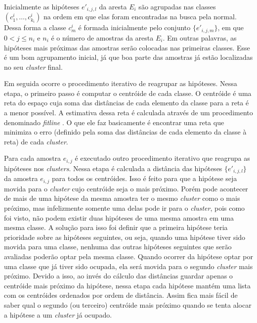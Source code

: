 

Inicialmente as hipóteses $e'_{i,j,l}$ da aresta $E_i$ são agrupadas nas classes $(c^i_1, \dots, c^i_{k_i})$ na ordem em que elas foram encontradas na busca pela normal. Dessa forma a classe $c^i_m$ é formada inicialmente pelo conjunto $\{e'_{i,j,m}\}$, em que $0 < j \leq n_i$ e $n_i$ é o número de amostras da aresta $E_i$. Em outras palavras, as hipóteses mais próximas das amostras serão colocadas nas primeiras classes. Esse é um bom agrupamento inicial, já que boa parte das amostras já estão localizadas no seu \emph{cluster} final.

Em seguida ocorre o procedimento iterativo de reagrupar as hipóteses. Nessa etapa, o primeiro passo é computar o centróide de cada classe. O centróide é uma reta do espaço cuja soma das distâncias de cada elemento da classe para a reta é a menor possível. A estimativa dessa reta é calculada através de um procedimento denominado \emph{fitline} \cite{fitline_doc}. O que ele faz basicamente é encontrar uma reta que minimiza o erro (definido pela soma das distâncias de cada elemento da classe à reta) de cada \emph{cluster}.

Para cada amostra $e_{i,j}$ é executado outro procedimento iterativo que reagrupa as hipóteses nos \emph{clusters}. Nessa etapa é calculada a distância das hipóteses $\{e'_{i,j,l}\}$ da amostra $e_{i,j}$ para todos os centróides. Isso é feito para que a hipótese seja movida para o \emph{cluster} cujo centróide seja o mais próximo. Porém pode acontecer de mais de uma hipótese da mesma amostra ter o mesmo \emph{cluster} como o mais próximo, mas infelizmente somente uma delas pode ir para o \emph{cluster}, pois como foi visto, não podem existir duas hipóteses de uma mesma amostra em uma mesma classe. A solução para isso foi definir que a primeira hipótese teria prioridade sobre as hipóteses seguintes, ou seja, quando uma hipótese tiver sido movida para uma classe, nenhuma das outras hipóteses seguintes que serão avaliadas poderão optar pela mesma classe. Quando ocorrer da hipótese optar por uma classe que já tiver sido ocupada, ela será movida para o segundo \emph{cluster} mais próximo. Devido a isso, ao invés do cálculo das distâncias guardar apenas o centróide mais próximo da hipótese, nessa etapa cada hipótese mantém uma lista com os centróides ordenados por ordem de distância. Assim fica mais fácil de saber qual o segundo (ou terceiro) centróide mais próximo quando se tenta alocar a hipótese a um \emph{cluster} já ocupado.

